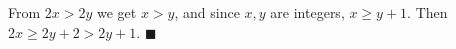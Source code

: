 From $2x>2y$ we get $x>y$, and since $x,y$ are integers, $x\ge y+1$. Then $2x\ge2y+2>2y+1$. $\blacksquare$
